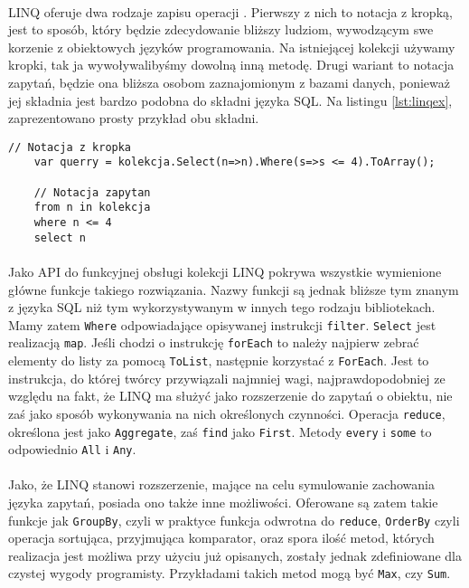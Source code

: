 \documentclass[a4paper,10pt]{report}
\begin{document}
\paragraph{}
LINQ oferuje dwa rodzaje zapisu operacji \cite{linq}. Pierwszy z nich to notacja z kropką, jest to sposób, który będzie zdecydowanie bliższy ludziom, wywodzącym swe korzenie z obiektowych języków programowania. Na istniejącej kolekcji używamy kropki, tak ja wywoływalibyśmy dowolną inną metodę. Drugi wariant to notacja zapytań, będzie ona bliższa osobom zaznajomionym z bazami danych, ponieważ jej składnia jest bardzo podobna do składni języka SQL. Na listingu  \ref{lst:linqex}, zaprezentowano prosty przykład obu składni.
\begin{lstlisting}[caption={Dwie formy LINQ},style=sharpc,label={lst:linqex}]
	// Notacja z kropka
	var querry = kolekcja.Select(n=>n).Where(s=>s <= 4).ToArray();

	// Notacja zapytan
	from n in kolekcja
	where n <= 4
	select n
\end{lstlisting}
\paragraph{}
Jako API do funkcyjnej obsługi kolekcji LINQ pokrywa wszystkie wymienione główne funkcje takiego rozwiązania.
Nazwy funkcji są jednak bliższe tym znanym z języka SQL niż tym wykorzystywanym w innych tego rodzaju bibliotekach. Mamy zatem \verb|Where| odpowiadające opisywanej instrukcji \verb|filter|. \verb|Select| jest realizacją \verb|map|. Jeśli chodzi o instrukcję \verb|forEach| to należy najpierw zebrać elementy do listy za pomocą \verb|ToList|, następnie korzystać z \verb|ForEach|. Jest to instrukcja, do której twórcy przywiązali najmniej wagi, najprawdopodobniej ze względu na fakt, że LINQ ma służyć jako rozszerzenie do zapytań o obiektu, nie zaś jako sposób wykonywania na nich określonych czynności. Operacja \verb|reduce|, określona jest jako \verb|Aggregate|, zaś \verb|find| jako \verb|First|. Metody \verb|every| i \verb|some| to odpowiednio \verb|All| i \verb|Any|.
\paragraph{}
Jako, że LINQ stanowi rozszerzenie, mające na celu symulowanie zachowania języka zapytań, posiada ono także inne możliwości. Oferowane są zatem takie funkcje jak \verb|GroupBy|, czyli w praktyce funkcja odwrotna do \verb|reduce|, \verb|OrderBy| czyli operacja sortująca, przyjmująca komparator, oraz spora ilość metod, których realizacja jest możliwa przy użyciu już opisanych, zostały jednak zdefiniowane dla czystej wygody programisty. Przykładami takich metod mogą być \verb|Max|, czy \verb|Sum|.
\end{document}
